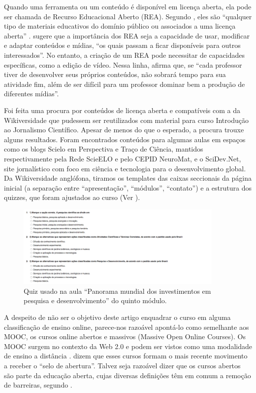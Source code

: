\documentclass{textolivre}
\begin{document}
Quando uma ferramenta ou um conteúdo é disponível em licença aberta, ela pode ser chamada de Recurso Educacional Aberto (REA). Segundo \textcite[p.~260]{aires2016}, eles são “qualquer tipo de materiais educativos do domínio público ou associados a uma licença aberta” \cite[p.~260]{aires2016}. \textcite[p.~52]{tori2015} sugere que a importância dos REA seja a capacidade de usar, modificar e adaptar conteúdos e mídias, “os quais passam a ficar disponíveis para outros interessados”. No entanto, a criação de um REA pode necessitar de capacidades específicas, como a edição de vídeo. Nessa linha, \textcite[p.~52]{tori2015} afirma que, se “cada professor tiver de desenvolver seus próprios conteúdos, não sobrará tempo para sua atividade fim, além de ser difícil para um professor dominar bem a produção de diferentes mídias”.

Foi feita uma procura por conteúdos de licença aberta e compatíveis com a da Wikiversidade que pudessem ser reutilizados com material para curso Introdução ao Jornalismo Científico. Apesar de menos do que o esperado, a procura trouxe alguns resultados. Foram encontrados conteúdos para algumas aulas em espaços como os blogs Scielo em Perspectiva e Traço de Ciência, mantidos respectivamente pela Rede ScieELO e pelo CEPID NeuroMat, e o SciDev.Net, site jornalístico com foco em ciência e tecnologia para o desenvolvimento global. Da Wikiversidade anglófona, tiramos os templates das caixas seccionais da página inicial (a separação entre “apresentação”, “módulos”, “contato”) e a estrutura dos quizzes, que foram ajustados ao curso (Ver ).

\begin{figure}[htbp]
\centering
\includegraphics[width=0.9\textwidth]{fig05.png}
\caption{Quiz usado na aula “Panorama mundial dos investimentos em pesquisa e desenvolvimento” do quinto módulo.}
\label{fig05}
\end{figure}

A despeito de não ser o objetivo deste artigo enquadrar o curso em alguma classificação de ensino online, parece-nos razoável apontá-lo como semelhante aos MOOC, os cursos online abertos e massivos (Massive Open Online Courses). Os MOOC surgem no contexto da Web 2.0 e podem ser vistos como uma modalidade de ensino a distância \cite[p.~185]{forno2013}. \textcite[p.~116]{amiel2015} dizem que esses cursos formam o mais recente movimento a receber o “selo de abertura”. Talvez seja razoável dizer que os cursos abertos são parte da educação aberta, cujas diversas definições têm em comum a remoção de barreiras, segundo \textcite[p.~180]{forno2013}.
\end{document}
